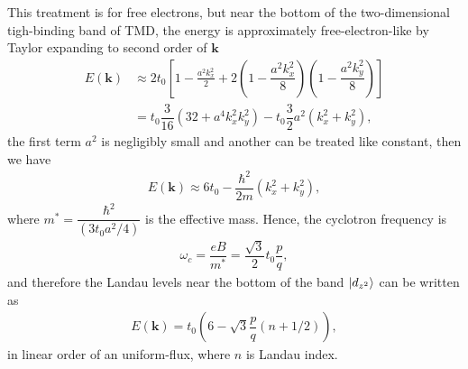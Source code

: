 \documentclass{report}
\newcommand{\f}[2]{\dfrac{#1}{#2}}
\begin{document}
This treatment is for free electrons, but near the bottom of the two-dimensional tigh-binding band of TMD, the energy is approximately free-electron-like by Taylor expanding to second order of $\mathbf{k}$ \cite{10.1119/1.1615568}
\begin{equation}
	\begin{aligned}
		E(\mathbf{k})
		 & \approx 2 t_{0} \left[1 - \frac{a^{2} k_{x}^{2}}{2} + 2\left(1 - \f{a^{2} k_{x}^{2}}{8}\right)\left(1 - \f{a^{2} k_{y}^{2}}{8}\right)\right] \\
		 & = t_{0} \f{3}{16} \left(32 + a^{4} k_{x}^{2} k_{y}^{2}\right) - t_{0} \f{3}{2} a^{2}(k_{x}^{2} + k_{y}^{2}) ,
	\end{aligned}
\end{equation}
the first term $a^{2}$ is negligibly small and another can be treated like constant, then we have
\begin{gather}
	E(\mathbf{k})
	\approx 6 t_{0} - \f{\hbar^{2}}{2m} (k_{x}^{2} + k_{y}^{2}),
\end{gather}
where $m^{*} = \f{\hbar^{2}}{(3t_{0}a^{2} / 4) }$ is the effective mass. Hence, the cyclotron frequency is
\begin{gather}
	\omega_{c} = \f{eB}{m^{*}} = \f{\sqrt{3}}{2} t_{0} \f{p}{q},
\end{gather}
and therefore the Landau levels near the bottom of the band $\ket{d_{z^{2}}}$ can be written as
\begin{gather}
	E(\mathbf{k}) = t_{0} \left(6 - \sqrt{3} \f{p}{q}( n + 1 /2)\right),
\end{gather}
in linear order of an uniform-flux, where $n$ is Landau index.
\end{document}
